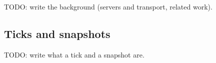 \documentclass[11pt]{article}
\begin{document}
%
%
TODO: write the background (servers and transport, related work).

\subsection{Ticks and snapshots}
TODO: write what a tick and a snapshot are.
\end{document}
